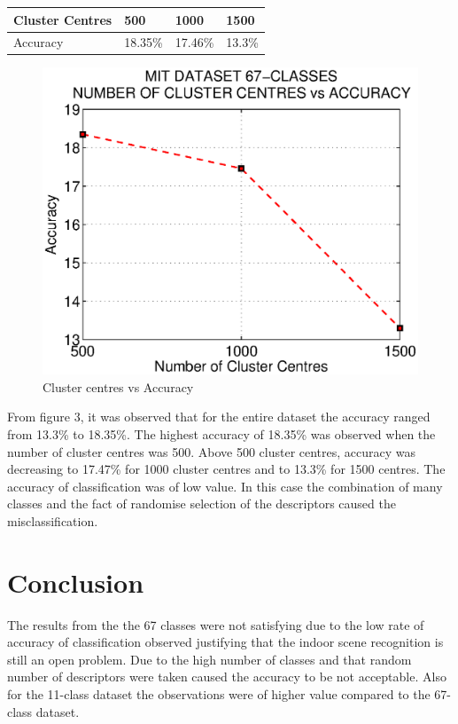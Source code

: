 \documentclass[10pt,twocolumn,letterpaper]{article}
\begin{document}
\begin{table}[h]
\begin{tabular}{|l|l|l|l|}
\hline
Cluster Centres & 500 & 1000 & 1500 \\ \hline
Accuracy & 18.35\% & 17.46\% & 13.3\% \\ \hline
\end{tabular}
\end{table}
\begin{figure}[h]
      \centering
      \includegraphics[width=0.7\linewidth]{img/67c.eps}
      \caption{Cluster centres vs Accuracy}
\end{figure}
From figure 3, it was observed that for the entire dataset the accuracy ranged from 13.3\% to 18.35\%. The highest accuracy of 18.35\% was observed when the number of cluster centres was 500. Above 500 cluster centres, accuracy was decreasing to 17.47\% for 1000 cluster centres and to 13.3\% for 1500 centres. The accuracy of classification was of low value. In this case the combination of many classes and the fact of randomise selection of the descriptors caused the misclassification.
\section{Conclusion}
The results from the the 67 classes were not satisfying due to the low rate of accuracy of classification observed justifying that the indoor scene recognition is still an open problem. Due to the high number of classes and that random number of descriptors were taken caused the accuracy to be not acceptable. Also for the 11-class dataset the observations were of higher value compared to the 67-class dataset.  

{\small


}
\end{document}
